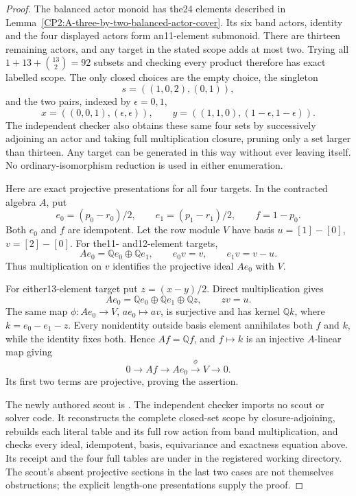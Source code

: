 \begin{proof}
The balanced actor monoid has the24 elements described in
Lemma~\ref{CP2:A-three-by-two-balanced-actor-cover}. Its six band
actors, identity and the four displayed actors form an11-element
submonoid. There are thirteen remaining actors, and any target
in the stated scope adds at most two. Trying all
$1+13+\binom{13}{2}=92$ subsets and checking every product
therefore has exact labelled scope. The only closed choices are
the empty choice, the singleton
\[
 s=((1,0,2),(0,1)),
\]
and the two pairs, indexed by $\epsilon=0,1$,
\[
 x=((0,0,1),(\epsilon,\epsilon)),\qquad
 y=((1,1,0),(1-\epsilon,1-\epsilon)).
\]
The independent checker also obtains these same four sets by
successively adjoining an actor and taking full multiplication
closure, pruning only a set larger than thirteen. Any target
can be generated in this way without ever leaving itself.
No ordinary-isomorphism reduction is used in either enumeration.

Here are exact projective presentations for all four targets.
In the contracted algebra $A$, put
\[
 e_0=(p_0-r_0)/2,\qquad e_1=(p_1-r_1)/2,
 \qquad f=1-p_0.
\]
Both $e_0$ and $f$ are idempotent. Let the row module $V$ have
basis $u=[1]-[0]$, $v=[2]-[0]$.
For the11- and12-element targets,
\[
 Ae_0=\mathbb Qe_0\oplus\mathbb Qe_1,\qquad
 e_0v=v,\qquad e_1v=v-u.
\]
Thus multiplication on $v$ identifies the projective ideal
$Ae_0$ with $V$.

For either13-element target put $z=(x-y)/2$. Direct multiplication
gives
\[
 Ae_0=\mathbb Qe_0\oplus\mathbb Qe_1\oplus\mathbb Qz,
 \qquad zv=u.
\]
The same map $\phi:Ae_0\to V$, $ae_0\mapsto av$, is surjective
and has kernel $\mathbb Qk$, where $k=e_0-e_1-z$.
Every nonidentity outside basis element annihilates both $f$
and $k$, while the identity fixes both. Hence $Af=\mathbb Qf$,
and $f\mapsto k$ is an injective $A$-linear map giving
\[
 0\longrightarrow Af\longrightarrow Ae_0
   \xrightarrow{\phi}V\longrightarrow0.
\]
Its first two terms are projective, proving the assertion.

The newly authored scout is
.
The independent checker
imports no scout or solver code. It reconstructs the complete
closed-set scope by closure-adjoining, rebuilds each literal
table and its full row action from band multiplication, and
checks every ideal, idempotent, basis, equivariance and exactness
equation above. Its receipt and the four full tables are under
 in the registered
working directory. The scout's absent projective sections in
the last two cases are not themselves obstructions; the explicit
length-one presentations supply the proof.
\end{proof}

